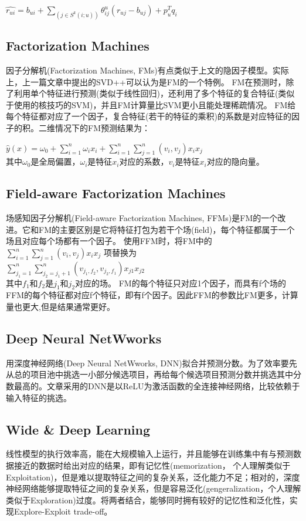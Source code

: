 \documentclass[]{article}
\begin{document}
$\hat{r_{ui}}=b_{ui}+\sum_{(j\in
	S^k(i;u))}\theta_{ij}^u(r_{uj}-b_{uj})+p_u^Tq_i$

\subsection{Factorization Machines}
因子分解机(Factorization Machines, FMs)\cite{Rendle2011}有点类似于上文的隐因子模型。实际上，上一篇文章中提出的SVD++可以认为是FM的一个特例。
FM在预测时，除了利用单个特征进行预测(类似于线性回归)，还利用了多个特征的复合特征(类似于使用的核技巧的SVM)，并且FM计算量比SVM更小且能处理稀疏情况。
FM给每个特征都对应了一个因子，复合特征(若干的特征的乘积)的系数是对应特征的因子的积。二维情况下的FM预测结果为：

$\hat{y}(x)=\omega_0+\sum_{i=1}^{n}\omega_ix_i+\sum_{i=1}^{n}\sum_{j=1}^{n}(v_i,v_j)x_ix_j$
~\\
其中$\omega_0$是全局偏置，$\omega_i$是特征$x_i$对应的系数，$v_i$是特征$x_i$对应的隐向量。

\subsection{Field-aware Factorization Machines}
场感知因子分解机(Field-aware Factorization Machines, FFMs)\cite{JuanY2016}是FM的一个改进。它和FM的主要区别是它将特征打包为若干个场(field)，每个特征都属于一个场且对应每个场都有一个因子。
使用FFM时，将FM中的
~\\
$\sum_{i=1}^{n}\sum_{j=1}^{n}(v_i,v_j)x_ix_j$
项替换为
~\\
$\sum_{j_1=1}^{n}\sum_{j_2=j_1+1}^{n}(v_{j_1,f_2},v_{j_2,f_1})x_{j1}x_{j2}$
~\\
其中$f_1$和$f_2$是$j_1$和$j_2$对应的场。
FM的每个特征只对应1个因子，而具有f个场的FFM的每个特征都对应f个特征，即有f个因子。因此FFM的参数比FM更多，计算量也更大,但是结果通常更好。

\subsection{Deep Neural NetWworks}
\cite{Covington2016}用深度神经网络(Deep Neural NetWworks, DNN)拟合并预测分数。为了效率要先从总的项目池中挑选一小部分候选项目，再给每个候选项目预测分数并挑选其中分数最高的。文章采用的DNN是以ReLU为激活函数的全连接神经网络，比较依赖于输入特征的挑选。

\subsection{Wide \& Deep Learning}
线性模型的执行效率高，能在大规模输入上运行，并且能够在训练集中有与预测数据接近的数据时给出对应的结果，即有记忆性(memorization， 个人理解类似于Exploitation)，但是难以提取特征之间的复杂关系，泛化能力不足；相对的，深度神经网络能够提取特征之间的复杂关系，但是容易泛化(gengeralization，个人理解类似于Exploration)过度。将两者结合，能够同时拥有较好的记忆性和泛化性，实现Explore-Exploit trade-off。
\end{document}
